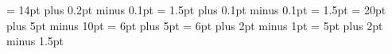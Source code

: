 %
\def\tenf@nts{\relax
    \textfont0=\tenrm          \scriptfont0=\sevenrm
      \scriptscriptfont0=\fiverm
    \textfont1=\teni           \scriptfont1=\seveni
      \scriptscriptfont1=\fivei
    \textfont2=\tensy          \scriptfont2=\sevensy
      \scriptscriptfont2=\fivesy
    \textfont3=\tenex          \scriptfont3=\tenex
      \scriptscriptfont3=\tenex
    \textfont\itfam=\tenit     \scriptfont\itfam=\seveni  %
    \textfont\slfam=\tensl     \scriptfont\slfam=\sevenrm %
    \textfont\bffam=\tenbf     \scriptfont\bffam=\sevenbf
      \scriptscriptfont\bffam=\fivebf
    \textfont\ttfam=\tentt
    \textfont\cpfam=\tencp }
%
%
%
%
\def\rm{\n@expand\f@m0 }
\def\mit{\n@expand\f@m1 }         \let\oldstyle=\mit
\def\cal{\n@expand\f@m2}
\def\it{\n@expand\f@m\itfam}
\def\sl{\n@expand\f@m\slfam}
\def\bf{\n@expand\f@m\bffam}
\def\tt{\n@expand\f@m\ttfam}
\def\caps{\n@expand\f@m\cpfam}    \let\cp=\caps
\def\em@{\rel@x\ifnum\f@ntkey=0\it\else
        \ifnum\f@ntkey=\bffam\it\else\rm\fi \fi }
\def\em{\n@expand\em@}
%
\def\fourteenpoint{\fourteenf@nts \samef@nt \b@gheight=14pt \setstr@t }
\def\twelvepoint{\twelvef@nts \samef@nt \b@gheight=12pt \setstr@t }
\def\tenpoint{\tenf@nts \samef@nt \b@gheight=10pt \setstr@t }
%
%
\normalbaselineskip = 14pt plus 0.2pt minus 0.1pt
\normallineskip = 1.5pt plus 0.1pt minus 0.1pt
\normallineskiplimit = 1.5pt
\newskip\normaldisplayskip
\normaldisplayskip = 20pt plus 5pt minus 10pt
\newskip\normaldispshortskip
\normaldispshortskip = 6pt plus 5pt
\newskip\normalparskip
\normalparskip = 6pt plus 2pt minus 1pt
\newskip\skipregister
\skipregister = 5pt plus 2pt minus 1.5pt
%
\newif\ifsingl@
\newif\ifdoubl@
\newif\iftwelv@  \twelv@true
%
\def\singlespace{\singl@true\doubl@false\spaces@t}
\def\doublespace{\singl@false\doubl@true\spaces@t}
\def\normalspace{\singl@false\doubl@false\spaces@t}
\def\Tenpoint{\tenpoint\twelv@false\spaces@t}
\def\Twelvepoint{\twelvepoint\twelv@true\spaces@t}
%
\def\spaces@t{\rel@x
      \iftwelv@ \ifsingl@\subspaces@t3:4;\else\subspaces@t1:1;\fi
       \else \ifsingl@\subspaces@t3:5;\else\subspaces@t4:5;\fi \fi
      \ifdoubl@ \multiply\baselineskip by 5
         \divide\baselineskip by 4 \fi }
%
